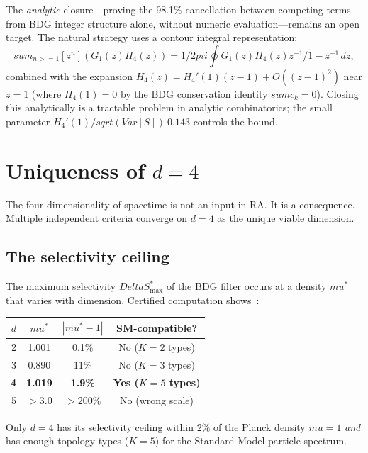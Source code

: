 \documentclass[11pt]{article}
\def\Delta{Delta}%
\def\mu{mu}%
\def\pi{pi}%
\def\mathrm#1{#1}%
\def\sqrt#1{sqrt(#1)}%
\def\frac#1#2{#1/#2}%
\def\geq{>=}%
\def\approx{~}%
\def\sum{sum}%
\begin{document}
The \emph{analytic} closure---proving the 98.1\% cancellation between competing terms from BDG integer structure alone, without numeric evaluation---remains an open target. The natural strategy uses a contour integral representation:
\begin{equation}
\sum_{n \geq 1} [z^n](G_1(z) H_4(z)) = \frac{1}{2\pi i} \oint G_1(z) H_4(z) \frac{z^{-1}}{1 - z^{-1}}\,dz,
\end{equation}
combined with the expansion $H_4(z) = H_4'(1)(z-1) + O((z-1)^2)$ near $z = 1$ (where $H_4(1) = 0$ by the BDG conservation identity $\sum c_k = 0$). Closing this analytically is a tractable problem in analytic combinatorics; the small parameter $H_4'(1)/\sqrt{\mathrm{Var}[S]} \approx 0.143$ controls the bound.

\section{Uniqueness of $d=4$}
\label{sec:d4}

The four-dimensionality of spacetime is not an input in RA. It is a consequence. Multiple independent criteria converge on $d=4$ as the unique viable dimension.

\subsection{The selectivity ceiling}

The maximum selectivity $\Delta S^*_{\max}$ of the BDG filter occurs at a density $\mu^*$ that varies with dimension. Certified computation shows~\cite{D4U02}:
\begin{center}
\begin{tabular}{rccc}
\toprule
$d$ & $\mu^*$ & $|\mu^*-1|$ & SM-compatible? \\
\midrule
2 & 1.001 & 0.1\% & No ($K=2$ types) \\
3 & 0.890 & 11\% & No ($K=3$ types) \\
\textbf{4} & \textbf{1.019} & \textbf{1.9\%} & \textbf{Yes ($K=5$ types)} \\
5 & $>3.0$ & $>200\%$ & No (wrong scale) \\
\bottomrule
\end{tabular}
\end{center}

Only $d=4$ has its selectivity ceiling within $2\%$ of the Planck density $\mu=1$ \emph{and} has enough topology types ($K=5$) for the Standard Model particle spectrum.
\end{document}
